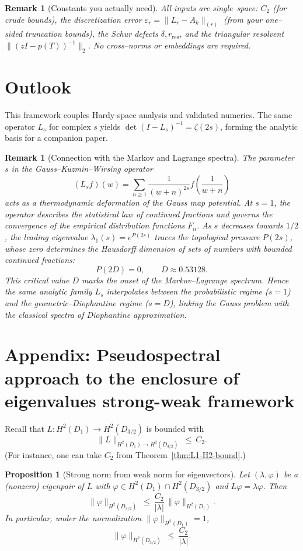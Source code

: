 \documentclass[11pt]{article}
\newtheorem{remark}[definition]{Remark}
\newtheorem{proposition}[definition]{Proposition}
\begin{document}
\begin{remark}[Constants you actually need]
All inputs are single–space: \(C_2\) (for crude bounds), the discretization error
\(\varepsilon_r=\|L_r-A_k\|_{(r)}\) (from your one–sided truncation bounds),
the Schur defects \(\delta, r_{\mathrm{res}}\), and the triangular resolvent
\(\|(zI-p(T))^{-1}\|_2\). No cross–norms or embeddings are required.
\end{remark}




\section{Outlook}
This framework couples Hardy-space analysis and validated numerics.
The same operator \(L_s\) for complex \(s\) yields
\(\det(I-L_s)^{-1}=\zeta(2s)\),
forming the analytic basis for a companion paper.

\begin{remark}[Connection with the Markov and Lagrange spectra]
The parameter \(s\) in the Gauss--Kuzmin--Wirsing operator
\[
(L_s f)(w)=\sum_{n\ge1}\frac{1}{(w+n)^{2s}}f\!\left(\frac{1}{w+n}\right)
\]
acts as a thermodynamic deformation of the Gauss map potential.
At \(s=1\), the operator describes the statistical law of continued fractions
and governs the convergence of the empirical distribution functions \(F_n\).
As \(s\) decreases towards \(1/2\), the leading eigenvalue
\(\lambda_1(s)=e^{P(2s)}\)
traces the topological pressure \(P(2s)\),
whose zero determines the Hausdorff dimension
of sets of numbers with bounded continued fractions:
\[
P(2D)=0,\qquad D\approx0.53128.
\]
This critical value \(D\) marks the onset of the
Markov--Lagrange spectrum.
Hence the same analytic family \(L_s\)
interpolates between the probabilistic regime (\(s=1\))
and the geometric--Diophantine regime (\(s=D\)),
linking the Gauss problem with the classical spectra of Diophantine approximation.
\end{remark}

\section{Appendix: Pseudospectral approach to the enclosure of eigenvalues strong-weak framework}

Recall that $L:H^2(D_1)\to H^2(D_{3/2})$ is bounded with
\[
\|L\|_{H^2(D_1)\to H^2(D_{3/2})}\ \le\ C_2.
\]
(For instance, one can take $C_2$ from Theorem~\ref{thm:L1-H2-bound}.)

\begin{proposition}[Strong norm from weak norm for eigenvectors]
\label{prop:strong-from-weak}
Let $(\lambda,\varphi)$ be a (nonzero) eigenpair of $L$ with
$\varphi\in H^2(D_1)\cap H^2(D_{3/2})$ and $L\varphi=\lambda\varphi$.
Then
\[
\boxed{\qquad
\|\varphi\|_{H^2(D_{3/2})}
\ \le\ \frac{C_2}{|\lambda|}\,\|\varphi\|_{H^2(D_1)}.
\qquad}
\]
In particular, under the normalization $\|\varphi\|_{H^2(D_1)}=1$,
\[
\|\varphi\|_{H^2(D_{3/2})}\ \le\ \frac{C_2}{|\lambda|}.
\]
\end{proposition}
\end{document}
